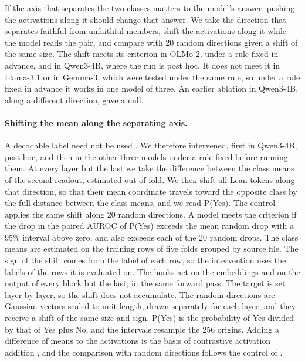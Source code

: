 \documentclass[10pt]{article}
\begin{document}
If the axis that separates the two classes matters to the model's answer, pushing the activations along it should
change that answer. We take the direction that separates faithful from unfaithful members, shift the activations along
it while the model reads the pair, and compare with 20 random directions given a shift of the same size. The shift
meets its criterion in OLMo-2, under a rule fixed in advance, and in Qwen3-4B, where the run is post hoc. It does not
meet it in Llama-3.1 or in Gemma-3, which were tested under the same rule, so under a rule fixed in advance it works in
one model of three. An earlier ablation in Qwen3-4B, along a different direction, gave a null.

\paragraph{Shifting the mean along the separating axis.} A decodable label need not be used \citep{elazar2021amnesic}.
We therefore intervened, first in Qwen3-4B, post hoc, and then in the other three models under a rule
fixed before running them. At every layer but the last we take the difference between the class means of the second
readout, estimated out of fold. We then shift all Lean tokens along that direction, so that their mean coordinate
travels toward the opposite class by the full distance between the class means, and we read P(Yes). The control
applies the same shift along 20 random directions. A model meets the criterion if the drop in the paired AUROC of
P(Yes) exceeds the mean random drop with a 95\% interval above zero, and also exceeds each of the 20 random drops. The
class means are estimated on the training rows of five folds grouped by source file. The sign of the shift comes from
the label of each row, so the intervention uses the labels of the rows it is evaluated on. The hooks act on the
embeddings and on the output of every block but the last, in the same forward pass. The target is set layer by layer,
so the shift does not accumulate. The random directions are Gaussian vectors scaled to unit length, drawn separately
for each layer, and they receive a shift of the same size and sign. P(Yes) is the probability of Yes divided by that
of Yes plus No, and the intervals resample the 256 origins. Adding a difference of means to the activations is the
basis of contrastive activation addition \citep{rimsky2024steering}, and the comparison with random directions follows
the control of \citet{elazar2021amnesic}.
\end{document}
